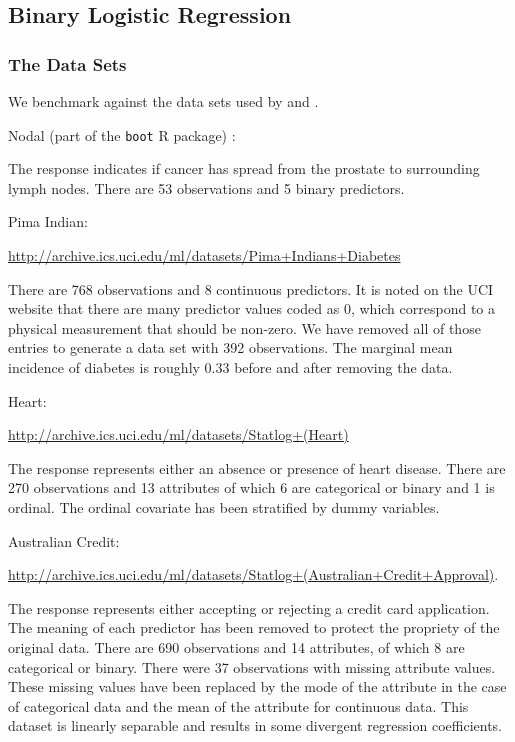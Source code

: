 \documentclass{article}
\begin{document}
\subsection{Binary Logistic Regression}

\subsubsection{The Data Sets}

We benchmark against the data sets used by \cite{holmes-held-2006} and
\cite{fruhwirth-schnatter-fruhwirth-2010}.

\begin{outline}

\1 Nodal (part of the \texttt{boot} R package) :

The response indicates if cancer has spread from the prostate to surrounding
lymph nodes.  There are 53 observations and 5 binary predictors.

\1 Pima Indian:

\url{http://archive.ics.uci.edu/ml/datasets/Pima+Indians+Diabetes}

There are 768 observations and 8 continuous predictors.  It is noted on the UCI
website that there are many predictor values coded as 0, which correspond to a
physical measurement that should be non-zero.  We have removed all of those
entries to generate a data set with 392 observations.  The marginal mean
incidence of diabetes is roughly 0.33 before and after removing the data.

\1 Heart:

\url{http://archive.ics.uci.edu/ml/datasets/Statlog+(Heart)}

The response represents either an absence or presence of heart disease.  There
are 270 observations and 13 attributes of which 6 are categorical or binary and
1 is ordinal.  The ordinal covariate has been stratified by dummy variables.

\1 Australian Credit: 

\url{http://archive.ics.uci.edu/ml/datasets/Statlog+(Australian+Credit+Approval)}.

The response represents either accepting or rejecting a credit card application.
The meaning of each predictor has been removed to protect the propriety of the
original data.  There are 690 observations and 14 attributes, of which 8 are
categorical or binary.  There were 37 observations with missing attribute
values.  These missing values have been replaced by the mode of the attribute in
the case of categorical data and the mean of the attribute for continuous data.
This dataset is linearly separable and results in some divergent regression
coefficients.


\end{outline}
\end{document}
